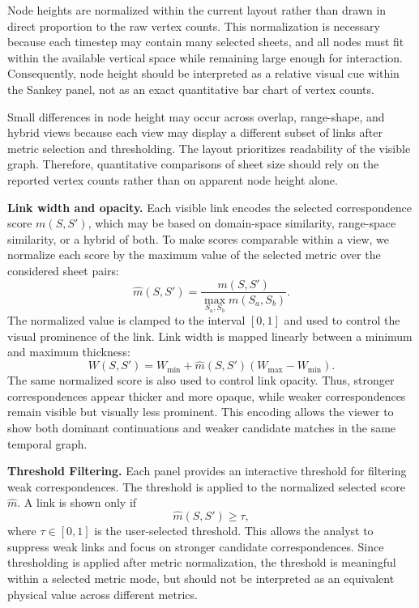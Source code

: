 \documentclass{vgtc}                          %
\newcommand{\Sheet}{S}
\newcommand{\myparagraph}[1]{\vspace{1mm} \noindent \textbf{#1}}
\begin{document}
Node heights are normalized within the current layout rather than drawn in direct proportion to the raw vertex counts. This normalization is necessary because each timestep may contain many selected sheets, and all nodes must fit within the available vertical space while remaining large enough for interaction. Consequently, node height should be interpreted as a relative visual cue within the Sankey panel, not as an exact quantitative bar chart of vertex counts.

Small differences in node height may occur across overlap, range-shape, and hybrid views because each view may display a different subset of links after metric selection and thresholding. The layout prioritizes readability of the visible graph. Therefore, quantitative comparisons of sheet size should rely on the reported vertex counts rather than on apparent node height alone.



\myparagraph{Link width and opacity.} Each visible link encodes the selected correspondence score $m(\Sheet,\Sheet')$, which may be based on domain-space similarity, range-space similarity, or a hybrid of both. To make scores comparable within a view, we normalize each score by the maximum value of the selected metric over the considered sheet pairs:
\[
\widehat{m}(\Sheet,\Sheet') =
\frac{m(\Sheet,\Sheet')}
{\max_{\Sheet_a,\Sheet_b} m(\Sheet_a,\Sheet_b)}.
\]
The normalized value is clamped to the interval $[0,1]$ and used to control the visual prominence of the link. Link width is mapped linearly between a minimum and maximum thickness:
\[
W(\Sheet,\Sheet') =
W_\mathrm{min}
+
\widehat{m}(\Sheet,\Sheet')
\left(W_\mathrm{max}-W_\mathrm{min}\right).
\]
The same normalized score is also used to control link opacity. Thus, stronger correspondences appear thicker and more opaque, while weaker correspondences remain visible but visually less prominent. This encoding allows the viewer to show both dominant continuations and weaker candidate matches in the same temporal graph.


\myparagraph{Threshold Filtering.} Each panel provides an interactive threshold for filtering weak correspondences. The threshold is applied to the normalized selected score $\widehat{m}$. A link is shown only if
\[
\widehat{m}(\Sheet,\Sheet') \geq \tau,
\]
where $\tau\in[0,1]$ is the user-selected threshold. This allows the analyst to suppress weak links and focus on stronger candidate correspondences. Since thresholding is applied after metric normalization, the threshold is meaningful within a selected metric mode, but should not be interpreted as an equivalent physical value across different metrics.
\end{document}
